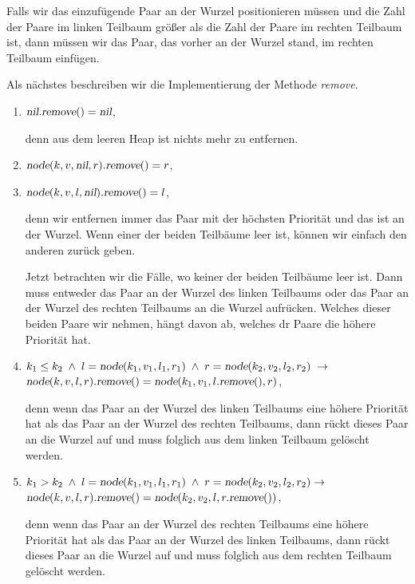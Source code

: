 \begin{enumerate}
      Falls wir das einzuf\"ugende Paar an der Wurzel
      positionieren m\"ussen und die Zahl der Paare im linken Teilbaum
      gr\"o{\ss}er als die Zahl der Paare im rechten Teilbaum ist,
      dann m\"ussen wir das Paar, das vorher an der Wurzel stand, im rechten Teilbaum
      einf\"ugen.
\end{enumerate}
Als n\"achstes beschreiben wir die Implementierung der Methode \textsl{remove}.
\begin{enumerate}
\item $\textsl{nil}.\textsl{remove}() = \textsl{nil}$,

      denn aus dem leeren Heap ist nichts mehr zu entfernen.
\item $\textsl{node}(k,v,\textsl{nil},r).\textsl{remove}() = r$,
  
\item $\textsl{node}(k,v,l,\textsl{nil}).\textsl{remove}() = l$,

      denn wir entfernen immer das Paar mit der h\"ochsten Priorit\"at und das ist an der
      Wurzel.  Wenn einer der beiden Teilb\"aume leer ist, k\"onnen wir einfach den anderen
      zur\"uck geben.

      Jetzt betrachten wir die F\"alle, wo keiner der beiden Teilb\"aume leer ist.
      Dann muss entweder das Paar an der Wurzel des linken Teilbaums
      oder das Paar an der Wurzel des rechten Teilbaums an die Wurzel aufr\"ucken.
      Welches dieser beiden Paare wir nehmen, h\"angt davon ab, welches dr Paare die h\"ohere
      Priorit\"at hat.
\item $k_1 \leq k_2 \;\wedge\; l = \textsl{node}(k_1,v_1,l_1,r_1) \;\wedge\; r =
      \textsl{node}(k_2,v_2,l_2,r_2) \;\rightarrow$ \\[0.1cm] 
      \hspace*{1.3cm} 
      $\textsl{node}(k,v,l,r).\textsl{remove}() =      \textsl{node}(k_1,v_1,l.\textsl{remove}(),r)$,

      denn wenn das Paar an der Wurzel des linken Teilbaums eine h\"ohere Priorit\"at hat
      als das Paar an der Wurzel des rechten Teilbaums, dann r\"uckt dieses Paar an
      die Wurzel auf und muss folglich aus dem linken Teilbaum gel\"oscht werden.
\item $k_1 > k_2 \;\wedge\; l = \textsl{node}(k_1,v_1,l_1,r_1) \;\wedge\; r = \textsl{node}(k_2,v_2,l_2,r_2) \rightarrow$ \\[0.1cm]
      \hspace*{1.3cm} 
      $\textsl{node}(k,v,l,r).\textsl{remove}() = \textsl{node}(k_2,v_2,l,r.\textsl{remove}())$,

      denn wenn das Paar an der Wurzel des rechten Teilbaums eine h\"ohere Priorit\"at hat
      als das Paar an der Wurzel des linken Teilbaums, dann r\"uckt dieses Paar an
      die Wurzel auf und muss folglich aus dem rechten Teilbaum gel\"oscht werden.  
\end{enumerate}
